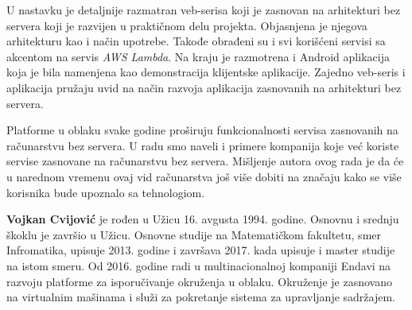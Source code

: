 \documentclass[12pt,oneside]{memoir}
\begin{document}
U nastavku je detaljnije razmatran veb-serisa koji je zasnovan na arhitekturi bez servera koji je razvijen u praktičnom delu projekta. Objasnjena je njegova arhitekturu kao i način upotrebe. Takođe obrađeni su i svi korišćeni servisi sa akcentom na servis \emph{AWS Lambda}. Na kraju je razmotrena i Android aplikacija koja je bila namenjena kao demonstracija klijentske aplikacije. Zajedno veb-seris i aplikacija pružaju uvid na način razvoja aplikacija zasnovanih na arhitekturi bez servera. 

Platforme u oblaku svake godine proširuju funkcionalnosti servisa zasnovanih na računarstvu bez servera. U radu smo naveli i primere kompanija koje već koriste servise zasnovane na računarstvu bez servera. Mišljenje autora ovog rada je da će u narednom vremenu ovaj vid računarstva još više dobiti na značaju kako se više korisnika bude upoznalo sa tehnologiom.

\literatura

\backmatter

\begin{biografija}
  \textbf{Vojkan Cvijović} je rođen u Užicu 16. avgusta 1994. godine. Osnovnu i srednju škoklu je završio u Užicu. Osnovne studije na Matematičkom fakultetu, smer Infromatika, upisuje 2013. godine i završava 2017. kada upisuje i master studije na istom smeru. Od 2016. godine radi u multinacionalnoj kompaniji Endavi na razvoju platforme za isporučivanje okruženja u oblaku. Okruženje je zasnovano na virtualnim mašinama i služi za pokretanje sistema za upravljanje sadržajem.
\end{biografija}
\end{document}
